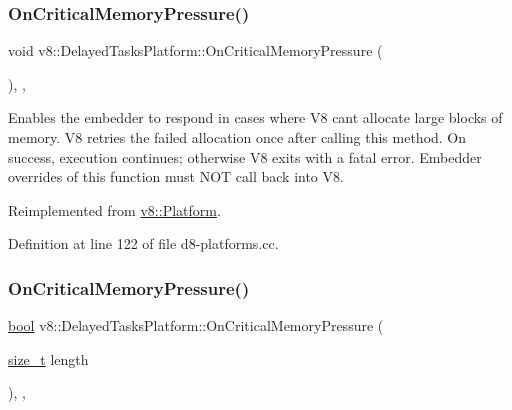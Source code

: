 \subsubsection{\texorpdfstring{On\+Critical\+Memory\+Pressure()}{OnCriticalMemoryPressure()}\hspace{0.1cm}{\footnotesize\ttfamily [1/2]}}
{\footnotesize\ttfamily void v8\+::\+Delayed\+Tasks\+Platform\+::\+On\+Critical\+Memory\+Pressure (\begin{DoxyParamCaption}{ }\end{DoxyParamCaption})\hspace{0.3cm}{\ttfamily [inline]}, {\ttfamily [override]}, {\ttfamily [virtual]}}

Enables the embedder to respond in cases where V8 can\textquotesingle{}t allocate large blocks of memory. V8 retries the failed allocation once after calling this method. On success, execution continues; otherwise V8 exits with a fatal error. Embedder overrides of this function must N\+OT call back into V8. 

Reimplemented from \mbox{\hyperlink{classv8_1_1Platform_a7ed41bddc1d1ebe51c55539198d0026e}{v8\+::\+Platform}}.



Definition at line 122 of file d8-\/platforms.\+cc.

\mbox{\label{classv8_1_1DelayedTasksPlatform_a0e71d1dd7f3096bccd5a118506e87597}} 
\subsubsection{\texorpdfstring{On\+Critical\+Memory\+Pressure()}{OnCriticalMemoryPressure()}\hspace{0.1cm}{\footnotesize\ttfamily [2/2]}}
{\footnotesize\ttfamily \mbox{\hyperlink{classbool}{bool}} v8\+::\+Delayed\+Tasks\+Platform\+::\+On\+Critical\+Memory\+Pressure (\begin{DoxyParamCaption}\item[{\mbox{\hyperlink{classsize__t}{size\+\_\+t}}}]{length }\end{DoxyParamCaption})\hspace{0.3cm}{\ttfamily [inline]}, {\ttfamily [override]}, {\ttfamily [virtual]}}

